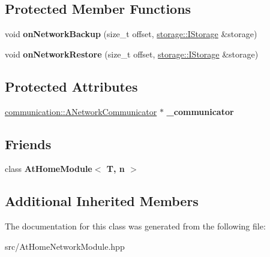 \subsection*{Protected Member Functions}
\begin{DoxyCompactItemize}
\item 
\mbox{\label{classathome_1_1module_1_1_at_home_network_module_a10787d6a4e5f3007212891f10347dba4}} 
void {\bfseries on\+Network\+Backup} (size\+\_\+t offset, \mbox{\hyperlink{classathome_1_1storage_1_1_i_storage}{storage\+::\+I\+Storage}} \&storage)
\item 
\mbox{\label{classathome_1_1module_1_1_at_home_network_module_ae69cb97ae8d892fdf27e5b8ad3dd8072}} 
void {\bfseries on\+Network\+Restore} (size\+\_\+t offset, \mbox{\hyperlink{classathome_1_1storage_1_1_i_storage}{storage\+::\+I\+Storage}} \&storage)
\end{DoxyCompactItemize}
\subsection*{Protected Attributes}
\begin{DoxyCompactItemize}
\item 
\mbox{\label{classathome_1_1module_1_1_at_home_network_module_a7c7dba4c623bd8d4d9bb898b6ba9ae63}} 
\mbox{\hyperlink{classathome_1_1communication_1_1_a_network_communicator}{communication\+::\+A\+Network\+Communicator}} $\ast$ {\bfseries \+\_\+communicator}
\end{DoxyCompactItemize}
\subsection*{Friends}
\begin{DoxyCompactItemize}
\item 
\mbox{\label{classathome_1_1module_1_1_at_home_network_module_a5db9640f2e295c39a19645b0d682d7d5}} 
class {\bfseries At\+Home\+Module$<$ T, n $>$}
\end{DoxyCompactItemize}
\subsection*{Additional Inherited Members}


The documentation for this class was generated from the following file\+:\begin{DoxyCompactItemize}
\item 
src/At\+Home\+Network\+Module.\+hpp\end{DoxyCompactItemize}
